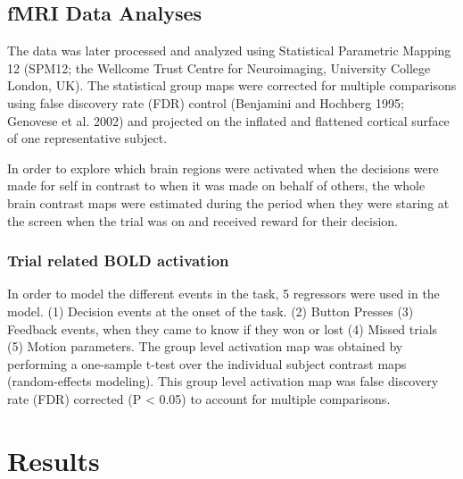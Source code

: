 \documentclass[11pt]{article}
\begin{document}
\subsection{fMRI Data Analyses}
The data was later processed  and analyzed using Statistical Parametric Mapping 12 (SPM12; the Wellcome Trust Centre for Neuroimaging, University College London, UK). The statistical group maps were corrected for multiple comparisons using false discovery rate (FDR) control (Benjamini and Hochberg 1995; Genovese et al. 2002) and projected on the inflated and flattened cortical surface of one representative subject.

In order to explore which brain regions were activated when the decisions were made for self in contrast to when it was made on behalf of others, the whole brain contrast maps were estimated during the period when they were staring at the screen when the trial was on and received reward for their decision. 

\subsubsection{Trial related BOLD activation}
In order to model the different events in the task, 5 regressors were used in the model. (1) Decision events at the onset of the task. (2) Button Presses (3) Feedback events, when they came to know if they won or lost (4) Missed trials (5) Motion parameters. The group level activation map was obtained by performing a one-sample t-test over the individual subject contrast maps (random-effects modeling). This group level activation map was false discovery rate (FDR) corrected (P < 0.05) to account for multiple comparisons. 


\section{Results}
\end{document}
